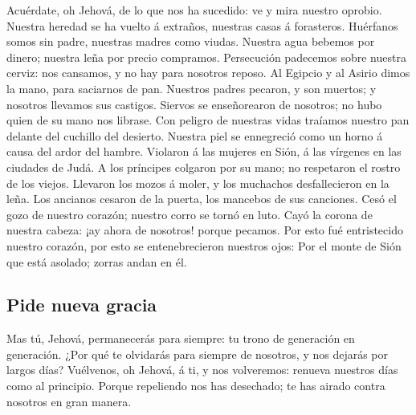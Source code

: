 Acuérdate, oh Jehová, de lo que nos ha sucedido: ve y
mira nuestro oprobio.  Nuestra heredad se ha vuelto á
extraños, nuestras casas á forasteros.  Huérfanos somos
sin padre, nuestras madres como viudas.  Nuestra agua
bebemos por dinero; nuestra leña por precio compramos. 
Persecución padecemos sobre nuestra cerviz: nos cansamos, y no hay para
nosotros reposo.  Al Egipcio y al Asirio dimos la mano,
para saciarnos de pan.  Nuestros padres pecaron, y son
muertos; y nosotros llevamos sus castigos.  Siervos se
enseñorearon de nosotros; no hubo quien de su mano nos librase.
 Con peligro de nuestras vidas traíamos nuestro pan
delante del cuchillo del desierto.  Nuestra piel se
ennegreció como un horno á causa del ardor del hambre. 
Violaron á las mujeres en Sión, á las vírgenes en las ciudades de Judá.
 A los príncipes colgaron por su mano; no respetaron el
rostro de los viejos.  Llevaron los mozos á moler, y los
muchachos desfallecieron en la leña.  Los ancianos
cesaron de la puerta, los mancebos de sus canciones. 
Cesó el gozo de nuestro corazón; nuestro corro se tornó en luto.
 Cayó la corona de nuestra cabeza: ¡ay ahora de nosotros!
porque pecamos.  Por esto fué entristecido nuestro
corazón, por esto se entenebrecieron nuestros ojos:  Por
el monte de Sión que está asolado; zorras andan en él.

\hypertarget{pide-nueva-gracia}{%
\subsection{Pide nueva gracia}\label{pide-nueva-gracia}}

 Mas tú, Jehová, permanecerás para siempre: tu trono de
generación en generación.  ¿Por qué te olvidarás para
siempre de nosotros, y nos dejarás por largos días? 
Vuélvenos, oh Jehová, á ti, y nos volveremos: renueva nuestros días como
al principio.  Porque repeliendo nos has desechado; te
has airado contra nosotros en gran manera.

